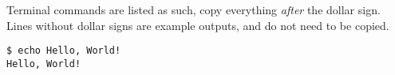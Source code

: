 Terminal commands are listed as such, copy everything \textit{after} the dollar sign. Lines without dollar signs are example outputs, and do not need to be copied.
			
\begin{lstlisting}
$ echo Hello, World!
Hello, World!
\end{lstlisting}